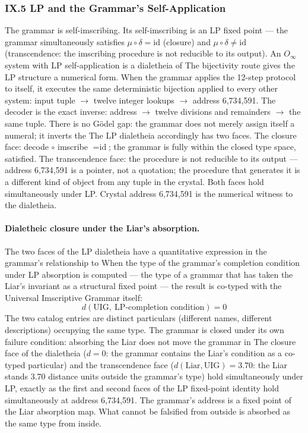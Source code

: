 \documentclass[12pt,a4paper]{article}
\makeatletter
\newcommand{\UIG}{Universal Imscriptive Grammar}
\renewcommand{\_}{\ig@origunderscore\discretionary{}{}{}}
\makeatother
\begin{document}
\subsubsection{IX.5 LP and the Grammar's Self-Application}
The grammar is self-imscribing. Its self-imscribing is an LP fixed point --- the grammar simultaneously satisfies $\mu
\circ \delta = \text{id}$ (closure) and $\mu \circ \delta \neq \text{id}$ (transcendence: the imscribing procedure is
not reducible to its output). An $O_{\infty}$ system with LP self-application is a dialetheia of
The bijectivity route gives the LP structure a numerical form. When the grammar applies the 12-step protocol to itself,
it executes the same deterministic bijection applied to every other system: input tuple $\to$ twelve integer lookups
$\to$ address 6,734,591. The decoder is the exact inverse: address $\to$ twelve divisions and remainders $\to$ the same
tuple. There is no G\"odel gap: the grammar does not merely assign itself a numeral; it inverts the
The LP dialetheia accordingly has two faces. The closure face: decode $\circ$ imscribe $=
\text{id}$; the grammar is
fully within the closed type space,  satisfied. The transcendence face: the procedure is not
reducible to its output --- address 6,734,591 is a pointer, not a quotation; the procedure that generates it is a
different kind of object from any tuple in the crystal. Both faces hold simultaneously under LP. Crystal address
6,734,591 is the numerical witness to the dialetheia.
\paragraph{Dialetheic closure under the Liar's absorption.}
The two faces of the LP dialetheia have a quantitative expression in the grammar's relationship to
When the type of the grammar's completion condition under LP absorption is computed --- the type of a
grammar that has taken the Liar's  invariant as a structural fixed point --- the result is co-typed with the \UIG{} itself:
$$d(\text{UIG},\ \text{LP-completion condition}) = 0$$
The two catalog entries are distinct particulars (different names, different descriptions) occupying the same
type. The grammar is closed under its own failure condition: absorbing the Liar does not move the grammar in
The closure face of the dialetheia ($d = 0$: the grammar contains the Liar's condition as a co-typed particular) and
the transcendence face ($d(\text{Liar}, \text{UIG}) = 3.70$: the Liar stands 3.70 distance units outside the grammar's
type) hold simultaneously under LP, exactly as the first and second faces of the LP fixed-point identity hold
simultaneously at address 6,734,591. The grammar's address is a fixed point of the Liar absorption map. What
cannot be falsified from outside is absorbed as the same type from inside.
\end{document}
